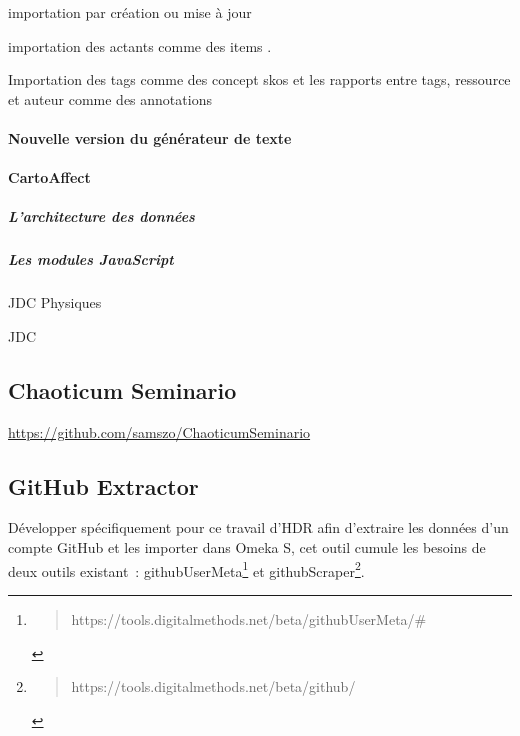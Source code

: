 \documentclass[
  letterpaper,
  DIV=11,
  numbers=noendperiod]{scrreprt}
\let\oldparagraph\paragraph
\renewcommand{\paragraph}[1]{\oldparagraph{#1}\mbox{}}
\let\oldsubparagraph\subparagraph
\renewcommand{\subparagraph}[1]{\oldsubparagraph{#1}\mbox{}}
\begin{document}
importation par création ou mise à jour

importation des actants comme des items .

Importation des tags comme des concept skos et les rapports entre tags,
ressource et auteur comme des annotations

\hypertarget{nouvelle-version-du-guxe9nuxe9rateur-de-texte}{%
\paragraph{Nouvelle version du générateur de
texte}\label{nouvelle-version-du-guxe9nuxe9rateur-de-texte}}

\hypertarget{sec-cartoAffect}{%
\paragraph{CartoAffect}\label{sec-cartoAffect}}

\hypertarget{larchitecture-des-donnuxe9es}{%
\subparagraph{L'architecture des
données}\label{larchitecture-des-donnuxe9es}}

\hypertarget{les-modules-javascript}{%
\subparagraph{Les modules JavaScript}\label{les-modules-javascript}}

JDC Physiques

JDC

\hypertarget{sec-chaoticumSeminario}{%
\subsection{Chaoticum Seminario}\label{sec-chaoticumSeminario}}

\url{https://github.com/samszo/ChaoticumSeminario}

\hypertarget{github-extractor}{%
\subsection{GitHub Extractor}\label{github-extractor}}

Développer spécifiquement pour ce travail d'HDR afin d'extraire les
données d'un compte GitHub et les importer dans Omeka S, cet outil
cumule les besoins de deux outils existant~: githubUserMeta\footnote{\begin{quote}
  https://tools.digitalmethods.net/beta/githubUserMeta/\#
  \end{quote}} et githubScraper\footnote{\begin{quote}
  https://tools.digitalmethods.net/beta/github/
  \end{quote}}.
\end{document}
